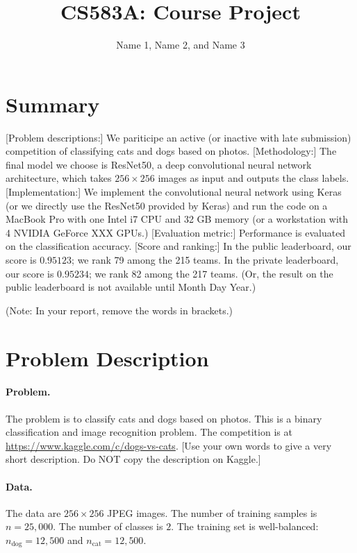 \documentclass[11pt]{article}
\numberwithin{equation}{section}
\begin{document}
\title{CS583A: Course Project}

\author{Name 1, Name 2, and Name 3}


\maketitle




\section{Summary}

[Problem descriptions:] We pariticipe an active (or inactive with late submission) competition of classifying cats and dogs based on photos. 
[Methodology:] The final model we choose is ResNet50, a deep convolutional neural network architecture, which takes $256\times 256$ images as input and outputs the class labels.
[Implementation:] We implement the convolutional neural network using Keras (or we directly use the ResNet50 provided by Keras) and run the code on a MacBook Pro with one Intel i7 CPU and 32 GB memory (or a workstation with 4 NVIDIA GeForce XXX GPUs.)
[Evaluation metric:] Performance is evaluated on the classification accuracy.
[Score and ranking:] In the public leaderboard, our score is $0.95123$; we rank 79 among the 215 teams. In the private leaderboard, our score is $0.95234$; we rank 82 among the 217 teams. (Or, the result on the public leaderboard is not available until Month Day Year.)

(Note: In your report, remove the words in brackets.)


\section{Problem Description}



\paragraph{Problem.}
The problem is to classify cats and dogs based on photos.
This is a binary classification and image recognition problem.
The competition is at \url{https://www.kaggle.com/c/dogs-vs-cats}.
[Use your own words to give a very short description. Do NOT copy the description on Kaggle.]



\paragraph{Data.} 
The data are $256\times 256$ JPEG images.
The number of training samples is $n=25,000$.
The number of classes is $2$.
The training set is well-balanced: $n_{\textrm{dog}} = 12,500$ and $n_{\textrm{cat}} = 12,500$.
\end{document}
